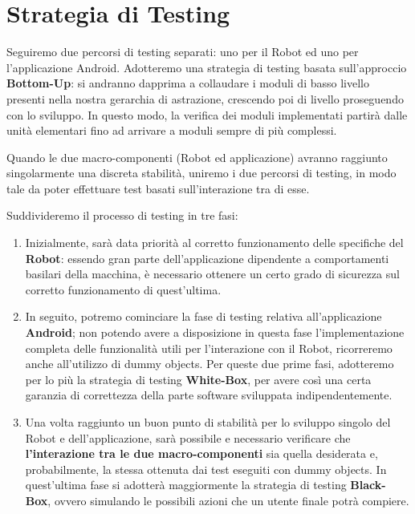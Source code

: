 \documentclass{article}
\begin{document}
\section{Strategia di Testing}

Seguiremo due percorsi di testing separati: uno per il Robot ed uno per
l'applicazione Android. Adotteremo una strategia di testing basata
sull'approccio \textbf{Bottom-Up}: si andranno dapprima a collaudare i moduli di
basso livello presenti nella nostra gerarchia di astrazione, crescendo poi
di livello proseguendo con lo sviluppo. In questo modo, la verifica dei
moduli implementati partirà dalle unità elementari fino ad arrivare a
moduli sempre di più complessi.

Quando le due macro-componenti (Robot ed applicazione) avranno raggiunto
singolarmente una discreta stabilità, uniremo i due percorsi di testing,
in modo tale da poter effettuare test basati sull'interazione tra di
esse.

Suddivideremo il processo di testing in tre fasi:

\begin{enumerate}
\item
  Inizialmente, sarà data priorità al corretto funzionamento delle
  specifiche del \textbf{Robot}: essendo gran parte dell'applicazione dipendente
  a comportamenti basilari della macchina, è necessario ottenere un
  certo grado di sicurezza sul corretto funzionamento di quest'ultima.
\item
  In seguito, potremo cominciare la fase di testing relativa
  all'applicazione \textbf{Android}; non potendo avere a disposizione in questa
  fase l'implementazione completa delle funzionalità utili per
  l'interazione con il Robot, ricorreremo anche all'utilizzo di dummy
  objects. Per queste due prime fasi, adotteremo per lo più la strategia
  di testing \textbf{White-Box}, per avere così una certa garanzia di correttezza
  della parte software sviluppata indipendentemente.
\item
  Una volta raggiunto un buon punto di stabilità per lo sviluppo singolo
  del Robot e dell'applicazione, sarà possibile e necessario verificare
  che \textbf{l'interazione tra le due macro-componenti} sia quella desiderata e,
  probabilmente, la stessa ottenuta dai test eseguiti con dummy objects.
  In quest'ultima fase si adotterà maggiormente la strategia di testing
  \textbf{Black-Box}, ovvero simulando le possibili azioni che un utente finale
  potrà compiere.
\end{enumerate}
\end{document}
